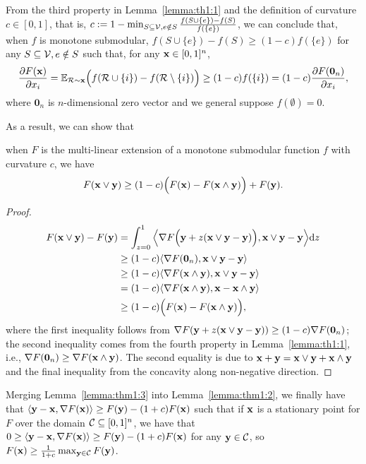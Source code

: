 From the third property in Lemma~\ref{lemma:th1:1} and the definition of curvature $c\in[0,1]$, that is, $c:=1-\min_{S\subseteq\mathcal{V}, e\notin S}\frac{f(S\cup\{e\})-f(S)}{f(\{e\})}$, we can conclude that, when $f$ is monotone submodular, $f(S\cup\{e\})-f(S)\ge(1-c)f(\{e\})$ for any $S\subseteq\mathcal{V}, e\notin S$ such that, for any $\mathbf{x}\in[0,1]^{n}$,
\begin{equation*}
\frac{\partial F(\mathbf{x})}{\partial x_{i}}=\mathbb{E}_{\mathcal{R}\sim\mathbf{x}}\Big(f(\mathcal{R}\cup\{i\})-f(\mathcal{R}\setminus\{i\})\Big)\ge(1-c)f(\{i\})=(1-c)\frac{\partial F(\textbf{0}_{n})}{\partial x_{i}},
\end{equation*} where $\textbf{0}_{n}$ is $n$-dimensional zero vector and we general suppose $f(\emptyset)=0$.

As a result, we can show that 
\begin{lemma}\label{lemma:thm1:3}
when  $F$ is the multi-linear extension of a monotone submodular function $f$ with curvature $c$, we have 
\begin{equation*}
F(\mathbf{x}\lor\mathbf{y})\ge(1-c)\Big(F(\mathbf{x})-F(\mathbf{x}\land\mathbf{y})\Big)+F(\mathbf{y}).
\end{equation*}
\end{lemma}
\begin{proof}
\begin{equation*}
	\begin{aligned}
		F(\mathbf{x}\lor\mathbf{y})-F(\mathbf{y})&=\int_{z=0}^{1}\Big\langle\nabla F\Big(\mathbf{y}+z(\mathbf{x}\lor\mathbf{y}-\mathbf{y})\Big),\mathbf{x}\lor\mathbf{y}-\mathbf{y}\Big\rangle\mathrm{d}z\\
		&\ge(1-c)\langle\nabla F(\textbf{0}_{n}),\mathbf{x}\lor\mathbf{y}-\mathbf{y}\rangle\\
		&\ge(1-c)\langle\nabla F(\mathbf{x}\land\mathbf{y}),\mathbf{x}\lor\mathbf{y}-\mathbf{y}\rangle\\
		&=(1-c)\langle\nabla F(\mathbf{x}\land\mathbf{y}),\mathbf{x}-\mathbf{x}\land\mathbf{y}\rangle\\
		&\ge(1-c)\Big(F(\mathbf{x})-F(\mathbf{x}\land\mathbf{y})\Big),
	\end{aligned}
\end{equation*} where the first inequality follows from $\nabla F(\mathbf{y}+z(\mathbf{x}\lor\mathbf{y}-\mathbf{y}))\ge(1-c)\nabla F(\textbf{0}_{n})$; the second inequality comes from the fourth property in Lemma~\ref{lemma:th1:1}, i.e., $\nabla F(\textbf{0}_{n})\ge\nabla F(\mathbf{x}\land\mathbf{y})$. The second equality is due to $\mathbf{x}+\mathbf{y}=\mathbf{x}\lor\mathbf{y}+\mathbf{x}\land\mathbf{y}$ and the final inequality from the concavity along non-negative direction.
\end{proof}
Merging Lemma~\ref{lemma:thm1:3} into Lemma~\ref{lemma:thm1:2}, we finally have that $  \langle\mathbf{y}-\mathbf{x},\nabla F(\mathbf{x})\rangle\ge F(\mathbf{y})-(1+c)F(\mathbf{x})$ such that if $\mathbf{x}$ is a stationary point for $F$ over the domain $\mathcal{C}\subseteq[0,1]^{n}$, we have that $ 0\ge \langle\mathbf{y}-\mathbf{x},\nabla F(\mathbf{x})\rangle\ge F(\mathbf{y})-(1+c)F(\mathbf{x})$ for any $\mathbf{y}\in\mathcal{C}$, so $F(\mathbf{x})\ge\frac{1}{1+c}\max_{\mathbf{y}\in\mathcal{C}}F(\mathbf{y})$.

